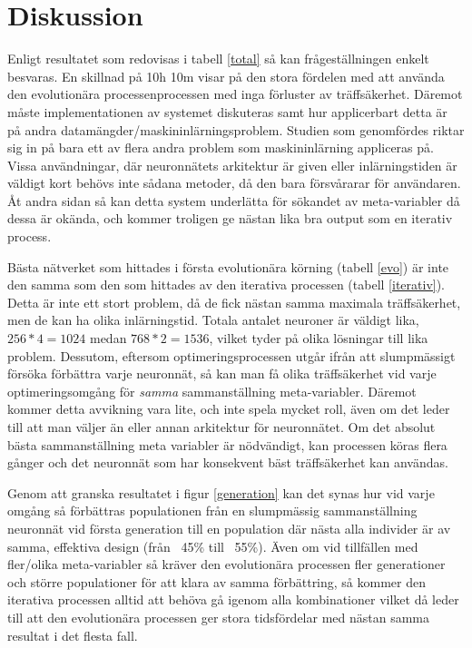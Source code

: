 \documentclass[a4paper, 12pt]{article}
\begin{document}
  \section{Diskussion}
  Enligt resultatet som redovisas i tabell \ref{total} så kan frågeställningen enkelt besvaras. En skillnad på 10h 10m visar på den stora fördelen med att använda den evolutionära processenprocessen med inga förluster av träffsäkerhet. Däremot måste implementationen av systemet diskuteras samt hur applicerbart detta är på andra datamängder/maskininlärningsproblem. Studien som genomfördes riktar sig in på bara ett av flera andra problem som maskininlärning appliceras på. Vissa användningar, där neuronnätets arkitektur är given eller inlärningstiden är väldigt kort behövs inte sådana metoder, då den bara försvårarar för användaren. Åt andra sidan så kan detta system underlätta för sökandet av meta-variabler då dessa är okända, och kommer troligen ge nästan lika bra output som en iterativ process.

  Bästa nätverket som hittades i första evolutionära körning (tabell \ref{evo}) är inte den samma som den som hittades av den iterativa processen (tabell \ref{iterativ}). Detta är inte ett stort problem, då de fick nästan samma maximala träffsäkerhet, men de kan ha olika inlärningstid. Totala antalet neuroner är väldigt lika, $256 * 4 = 1024$ medan $768 * 2 = 1536$, vilket tyder på olika lösningar till lika problem. Dessutom, eftersom optimeringsprocessen utgår ifrån att slumpmässigt försöka förbättra varje neuronnät, så kan man få olika träffsäkerhet vid varje optimeringsomgång för \textit{samma} sammanställning meta-variabler. Däremot kommer detta avvikning vara lite, och inte spela mycket roll, även om det leder till att man väljer än eller annan arkitektur för neuronnätet. Om det absolut bästa sammanställning meta variabler är nödvändigt, kan processen köras flera gånger och det neuronnät som har konsekvent bäst träffsäkerhet kan användas.

  Genom att granska resultatet i figur \ref{generation} kan det synas hur vid varje omgång så förbättras populationen från en slumpmässig sammanställning neuronnät vid första generation till en population där nästa alla individer är av samma, effektiva design (från ~45\% till ~55\%). Även om vid tillfällen med fler/olika meta-variabler så kräver den evolutionära processen fler generationer och större populationer för att klara av samma förbättring, så kommer den iterativa processen alltid att behöva gå igenom alla kombinationer vilket då leder till att den evolutionära processen ger stora tidsfördelar med nästan samma resultat i det flesta fall.
\end{document}
